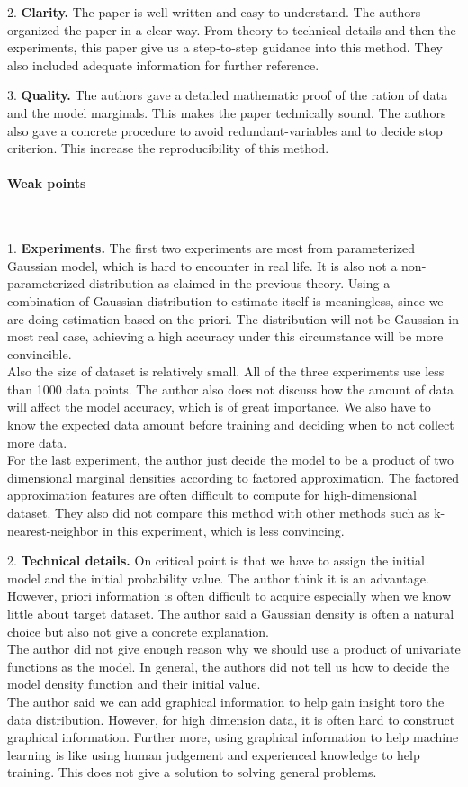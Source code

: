 \documentclass{article}
\begin{document}
2. \textbf{Clarity. }The paper is well written and easy to understand. The authors organized the paper in a clear way. From theory to technical details and then the experiments, this paper give us a step-to-step guidance into this method. They also included adequate information for further reference.

3. \textbf{Quality.} The authors gave a detailed mathematic proof of the ration of data and the model marginals. This makes the paper technically sound. The authors also gave a concrete procedure to avoid redundant-variables and to decide stop criterion. This increase the reproducibility of this method.

\paragraph{Weak points}  \ 

1. \textbf{Experiments.} The first two experiments are most from parameterized Gaussian model, which is hard to encounter in real life. It is also not a non-parameterized distribution as claimed in the previous theory. Using a combination of Gaussian distribution to estimate itself is meaningless, since we are doing estimation based on the priori. The distribution will not be Gaussian in most real case, achieving a high accuracy under this circumstance will be more convincible.\\
Also the size of dataset is relatively small. All of the three experiments use less than 1000 data points. The author also does not discuss how the amount of data will affect the model accuracy, which is of great importance. We also have to know the expected data amount before training and deciding when to not collect more data.\\
For the last experiment, the author just decide the model to be a product of two dimensional marginal densities according to factored approximation. The factored approximation features are often difficult to compute for high-dimensional dataset. 
They also did not compare this method with other methods such as k-nearest-neighbor in this experiment, which is less convincing.  

2. \textbf{Technical details.} On critical point is that we have to assign the initial model and the initial probability value. The author think it is an advantage. However, priori information is often difficult to acquire especially when we know little about target dataset. The author said a Gaussian density is often a natural choice but also not give a concrete explanation. \\
The author did not give enough reason why we should use a product of univariate functions as the model. In general, the authors did not tell us how to decide the model density function and their initial value.\\
The author said we can add graphical information to help gain insight toro the data distribution. However, for high dimension data, it is often hard to construct graphical information. Further more, using graphical information to help machine learning is like using human judgement and experienced knowledge to help training. This does not give a solution to solving general problems.



\newpage



\end{document}
